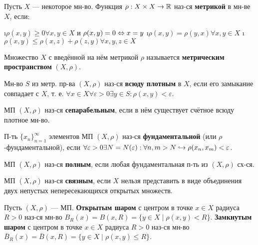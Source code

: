 



\newcommand{\ra}{\rightarrow}
\newcommand{\cross}{\times}
\newcommand{\bf}{\textbf}
\newcommand{\eps}{\varepsilon}
\newcommand{\norm}[1]{\left\lVert#1\right\rVert}

\begin{defn}
Пусть $X$ --- некоторое мн-во. Функция $\rho:X \cross X \ra \R$ наз-ся \textbf{метрикой} в мн-ве $X$, если:
\begin{enumerate}
	\i $\rho(x, y) \ge 0 \forall x, y \in X$ и $\rho(x, y) = 0 \Leftrightarrow x=y$
	\i $\rho(x, y) = \rho(y, x) \forall x, y \in X$
	\i $\rho(x, y) \le \rho(x, z)+\rho(z, y) \forall x, y, z \in X$
\end{enumerate}
Множество $X$ с введённой на нём метрикой $\rho$ называется \bf{метрическим пространством} $(X, \rho)$.
\end{defn}

\begin{defn}
Мн-во $S$ из метр. пр-ва $(X, \rho)$ наз-ся \bf{всюду плотным} в $X$, если его замыкание совпадает с $X$, т. е. $\forall x \in X \forall \eps > 0 \exists y \in S: \rho(x, y)<\eps$.	
\end{defn}

\begin{defn}
МП $(X, \rho)$ наз-ся \bf{сепарабельным}, если в нём существует счётное всюду плотное мн-во. 
\end{defn}

\begin{defn}
П-ть $\{x_n\}_{n=1}^{\infty}$ элементов МП $(X, \rho)$ наз-ся \bf{фундаментальной} (или $\rho$-фундаментальной), если $\forall \eps > 0 \exists N = N(\eps):\forall n, m > N \Have \rho(x_n, x_m) < \eps$.
\end{defn}

\begin{defn}
МП $(X, \rho)$ наз-ся \bf{полным}, если любая фундаментальная п-ть из $(X, \rho)$ сх-ся.
\end{defn}

\begin{defn}
МП $(X, \rho)$ наз-ся \bf{связным}, если $X$ нельзя представить в виде объединения двух непустых непересекающихся открытых множеств.
\end{defn}

\begin{defn}
Пусть $(X, \rho)$ --- МП. \bf{Открытым шаром} с центром в точке $x \in X$ радиуса $R>0$ наз-ся мн-во $B_R(x) = B(x, R) = \{y \in X \mid \rho(x, y) < R\}$.
\bf{Замкнутым шаром} с центром в точке $x \in X$ радиуса $R>0$ наз-ся мн-во $\bar{B}_R(x) = \bar{B}(x, R) = \{y \in X \mid \rho(x, y) \le R\}$.
\end{defn}

